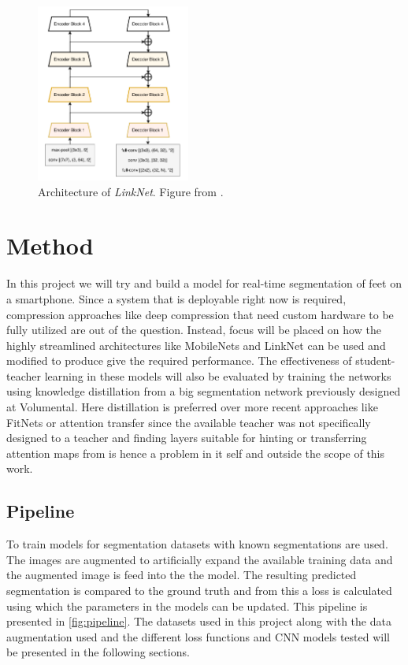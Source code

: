 \documentclass{kththesis}
\begin{document}
\begin{figure}[h]
  \centering
  \includegraphics[width=0.45\textwidth]{LinkNet}
  \caption{Architecture of \textit{LinkNet}. Figure from \textcite{chaurasia2017linknet}.}
  \label{fig:LinkNet}
\end{figure}


\chapter{Method} \label{chap:method}

In this project we will try and build a model for real-time segmentation of feet
on a smartphone. Since a system that is deployable right now is required,
compression approaches like deep compression that need custom hardware to be
fully utilized are out of the question. Instead, focus will be placed on how
the highly streamlined architectures like MobileNets and LinkNet can be used and
modified to produce give the required performance. The effectiveness of
student-teacher learning in these models will also be evaluated by training the
networks using knowledge distillation from a big segmentation network previously
designed at Volumental. Here distillation is preferred over more recent
approaches like FitNets or attention transfer since the available teacher was
not specifically designed to a teacher and finding layers suitable for hinting or
transferring attention maps from is hence a problem in it self and outside the
scope of this work.%

\section{Pipeline}
To train models for segmentation datasets with known segmentations are used. The
images are augmented to artificially expand the available training data and the
augmented image is feed into the the model. The resulting predicted segmentation
is compared to the ground truth and from this a loss is calculated using which
the parameters in the models can be updated. This pipeline is presented in
\cref{fig:pipeline}. The datasets used in this project along with the data
augmentation used and the different loss functions and CNN models tested will be
presented in the following sections.
\end{document}
